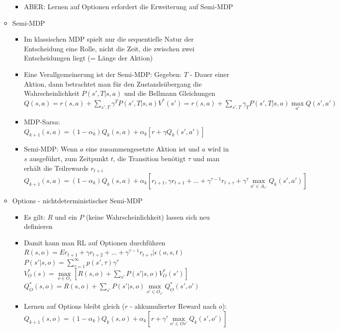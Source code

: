 \documentclass[paper=a4, fontsize=11pt]{scrartcl} %
\numberwithin{equation}{section} %
\numberwithin{figure}{section} %
\numberwithin{table}{section} %
\begin{document}
\begin{itemize}
\begin{itemize}
\begin{itemize}
\item ABER: Lernen auf Optionen erfordert die Erweiterung auf Semi-MDP
\end{itemize}
\item Semi-MDP
\begin{itemize}
\item Im klassischen MDP spielt nur die sequentielle Natur der Entscheidung eine Rolle, nicht die Zeit, die zwischen zwei Entscheidungen liegt (= Länge der Aktion)
\item Eine Verallgemeinerung ist der Semi-MDP: Gegeben: $T$ - Dauer einer Aktion, dann betrachtet man für den Zustandsübergang die Wahrscheinlichkeit $P(s',T|s,a)$ und die Bellmann Gleichungen\\ $Q(s,a) = r(s,a) + \sum\limits_{s',T} \gamma^T P(s',T|s,a) V^*(s') = r(s,a) + \sum\limits_{s',T} \gamma_T P(s',T|s,a) \max\limits_{a'} Q(s',a')$
\item MDP-Sarsa: $Q_{k+1}(s,a) = (1-\alpha_k)Q_k(s,a)+\alpha_k[r+\gamma Q_k(s',a')]$
\item Semi-MDP: Wenn $a$ eine zusammengesetzte Aktion ist und $a$ wird in $s$ ausgeführt, zum Zeitpunkt $t$, die Transition benötigt $\tau$ und man erhält die Teilrewards $r_{t+i}$\\
$Q_{k+1}(s,a) = (1-\alpha_k)Q_k(s,a)+\alpha_k[r_{t+1},\gamma r_{t+1} + ... + \gamma^{\tau-1}r_{t+\tau}+\gamma^\tau \max\limits_{a' \in A_{s'}} Q_k(s',a')]$
\end{itemize}
\item Options - nichtdeterministischer Semi-MDP
\begin{itemize}
\item Es gilt: $R$ und ein $P$ (keine Wahrscheinlichkeit) lassen sich neu definieren
\item Damit kann man RL auf Optionen durchführen\\ $R(s,o) = E{r_{t+1}+\gamma r_{t+2}+...+\gamma^{\tau-1}r_{t+\tau}|\epsilon(o,s,t)}$\\ $P(s'|s,o) = \sum\limits_{\tau = 1}^\infty p(s',\tau) \gamma^\tau$\\ $V_O^*(s) = \max\limits_{o \in O_s}[R(s,o)+\sum\limits_{s'}P(s'|s,o)V_O^*(s')]$\\ $Q_O^*(s,o) = R(s,o) + \sum\limits_{s'} P(s'|s,o) \max\limits_{o' \in O_{s'}} Q_O^*(s',o')$
\item Lernen auf Options bleibt gleich ($r$ - akkumulierter Reward nach $o$): $Q_{k+1}(s,o) = (1-\alpha_k)Q_k(s,o)+\alpha_k[r+\gamma^\tau \max\limits_{o' \in O{s'}}Q_k(s',o')]$
\end{itemize}

\end{itemize}
\end{itemize}
\end{document}
